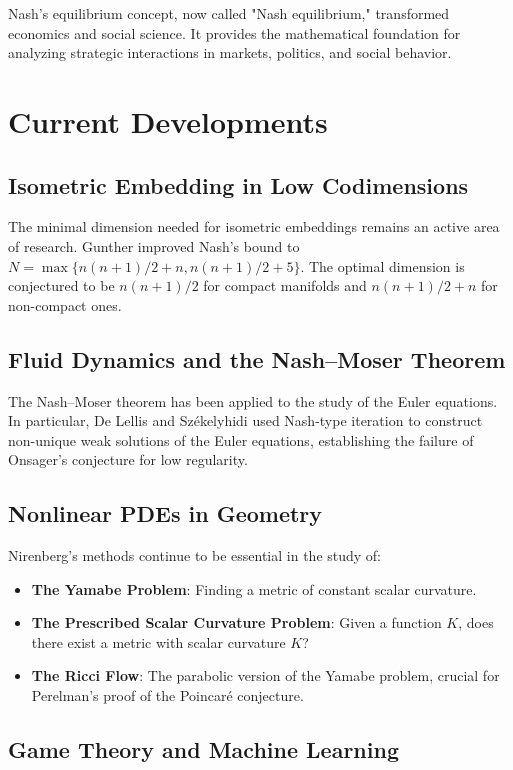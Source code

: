 Nash's equilibrium concept, now called "Nash equilibrium," transformed economics and social science. It provides the mathematical foundation for analyzing strategic interactions in markets, politics, and social behavior.

\section{Current Developments}

\subsection{Isometric Embedding in Low Codimensions}

The minimal dimension needed for isometric embeddings remains an active area of research. Gunther improved Nash's bound to $N = \max\{n(n+1)/2 + n, n(n+1)/2 + 5\}$. The optimal dimension is conjectured to be $n(n+1)/2$ for compact manifolds and $n(n+1)/2 + n$ for non-compact ones.

\subsection{Fluid Dynamics and the Nash--Moser Theorem}

The Nash--Moser theorem has been applied to the study of the Euler equations. In particular, De Lellis and Sz\'ekelyhidi used Nash-type iteration to construct non-unique weak solutions of the Euler equations, establishing the failure of Onsager's conjecture for low regularity.

\subsection{Nonlinear PDEs in Geometry}

Nirenberg's methods continue to be essential in the study of:
\begin{itemize}
\item \textbf{The Yamabe Problem}: Finding a metric of constant scalar curvature.
\item \textbf{The Prescribed Scalar Curvature Problem}: Given a function $K$, does there exist a metric with scalar curvature $K$?
\item \textbf{The Ricci Flow}: The parabolic version of the Yamabe problem, crucial for Perelman's proof of the Poincar\'e conjecture.
\end{itemize}

\subsection{Game Theory and Machine Learning}

